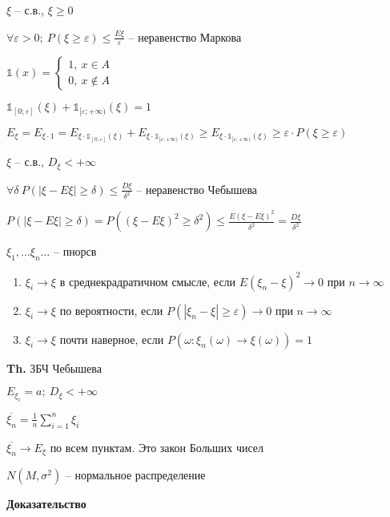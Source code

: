 \documentclass[14pt, letter paper]{article}
\begin{document}
$\xi$ -- с.в., $\xi \geq 0$

$\forall \varepsilon > 0;\ P(\xi \geq \varepsilon) \leq \frac{E\xi}{\varepsilon}$ -- неравенство Маркова

$\mathbb{1}(x) = \left\{ \begin{gathered}
    1,\ x \in A \\
    0,\ x \not\in A
\end{gathered} \right.$

$\mathbb{1}_{[0; \varepsilon]}(\xi) + \mathbb{1}_{[\varepsilon; +\infty)}(\xi) = 1$

$E_\xi = E_{\xi \cdot 1} = E_{\xi \cdot \mathbb{1}_{[0; \varepsilon]}(\xi)} + E_{\xi \cdot \mathbb{1}_{[\varepsilon; +\infty)}(\xi)} \geq E_{\xi \cdot \mathbb{1}_{[\varepsilon; +\infty)}(\xi)} \geq \varepsilon \cdot P(\xi \geq \varepsilon)$

$\xi$ -- с.в., $D_\xi < +\infty$

$\forall \delta\ P(|\xi - E\xi| \geq \delta) \leq \frac{D\xi}{\delta^2}$ -- неравенство Чебышева

$P(|\xi - E\xi| \geq \delta) = P((\xi - E\xi)^2 \geq \delta^2) \leq \frac{E(\xi - E\xi)^2}{\delta^2} = \frac{D\xi}{\delta^2}$

$\xi_1, \ldots \xi_n \ldots$ -- пнорсв 

\begin{enumerate}
    \item $\xi_i \rightarrow \xi$ в среднекрадратичном смысле, если $E(\xi_n - \xi)^2 \rightarrow 0$ при $n \rightarrow \infty$
    \item $\xi_i \rightarrow \xi$ по вероятности, если $P(|\xi_n - \xi| \geq \varepsilon) \rightarrow 0$ при $n \rightarrow \infty$
    \item $\xi_i \rightarrow \xi$ почти наверное, если $P(\omega : \xi_n(\omega) \rightarrow \xi(\omega)) = 1$
\end{enumerate}

\textbf{Th.} ЗБЧ Чебышева

$E_{\xi_i} = a;\ D_\xi < +\infty$

$\overline{\xi_n} = \frac{1}{n} \sum\limits_{i=1}^n \xi_i$

$\overline{\xi_n} \rightarrow E_\xi$ по всем пунктам. Это закон {\Huge Больших} чисел

$N(M, \sigma^2)$ -- нормальное распределение

\begin{center}
    \textbf{Доказательство}
\end{center}
\end{document}

